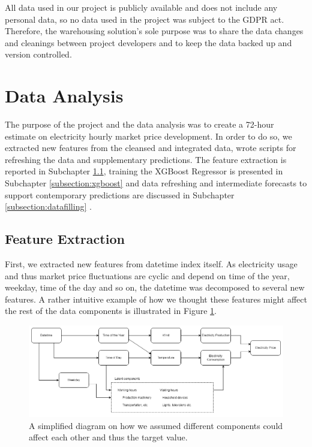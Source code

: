 \documentclass{article}
\begin{document}
All data used in our project is publicly available and does not include any personal data, so no data used in the project was subject to the GDPR act. Therefore, the warehousing solution's sole purpose was to share the data changes and cleanings between project developers and to keep the data backed up and version controlled.

\section{Data Analysis}
\label{section:analysis}

The purpose of the project and the data analysis was to create a 72-hour estimate on electricity hourly market price development. In order to do so, we extracted new features from the cleansed and integrated data, wrote scripts for refreshing the data and supplementary predictions. The feature extraction is reported in Subchapter \ref{subsection:extraction}, training the XGBoost Regressor is presented in Subchapter \ref{subsection:xgboost} and data refreshing and intermediate forecasts to support contemporary predictions are discussed in Subchapter \ref{subsection:datafilling} .

\subsection{Feature Extraction}
\label{subsection:extraction}

First, we extracted new features from datetime index itself. As electricity usage and thus market price fluctuations are cyclic and depend on time of the year, weekday, time of the day and so on, the datetime was decomposed to several new features. A rather intuitive example of how we thought these features might affect the rest of the data components is illustrated in Figure \ref{fig:components}.

\begin{figure}[ht] 
\centering
\includegraphics[width=\textwidth]{report/images/components.png}
\caption{A simplified diagram on how we assumed different components could affect each other and thus the target value.}
\label{fig:components} 
\end{figure}
\end{document}
